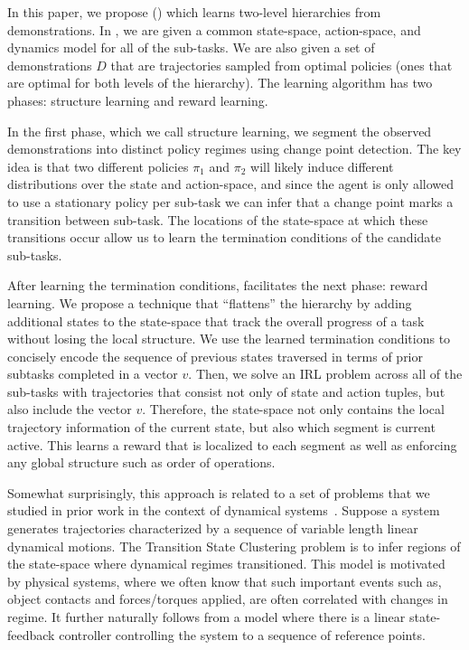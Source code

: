 In this paper, we propose \hirlfull (\hirl) which learns two-level hierarchies from demonstrations. 
In \hirl, we are given a common state-space, action-space, and dynamics model for all of the sub-tasks. 
We are also given a set of demonstrations $D$ that are trajectories sampled from optimal policies (ones that are optimal for both levels of the hierarchy).
The learning algorithm has two phases: structure learning and reward learning.

In the first phase, which we call structure learning, we segment the observed demonstrations into distinct policy regimes using change point detection.
The key idea is that two different policies $\pi_1$ and $\pi_2$ will likely induce different distributions over the state and action-space, and since the agent is only allowed to use a stationary policy per sub-task we can infer that a change point marks a transition between sub-task.
The locations of the state-space at which these transitions occur allow us to learn the termination conditions of the candidate sub-tasks.

After learning the termination conditions, facilitates the next phase: reward learning.
We propose a technique that ``flattens'' the hierarchy by adding additional states to the state-space that track the overall progress of a task without losing the local structure.
We use the learned termination conditions to concisely encode the sequence of previous states traversed in terms of prior subtasks completed in a vector $v$.
Then, we solve an IRL problem across all of the sub-tasks with trajectories that consist not only of state and action tuples, but also include the vector $v$.
Therefore, the state-space not only contains the local trajectory information of the current state, but also which segment is current active.
This learns a reward that is localized to each segment as well as enforcing any global structure such as order of operations.

Somewhat surprisingly, this approach is related to a set of problems that we studied in prior work in the context of dynamical systems~\cite{krishnan2015tsc,murali2016}.
Suppose a system generates trajectories  characterized by a sequence of variable length linear dynamical motions.
The Transition State Clustering problem is to infer regions of the state-space where dynamical regimes transitioned.
This model is motivated by physical systems, where we often know that such important events such as, object contacts and forces/torques applied, are often correlated with changes in regime.
It further naturally follows from a model where there is a linear state-feedback controller controlling the system to a sequence of reference points.









